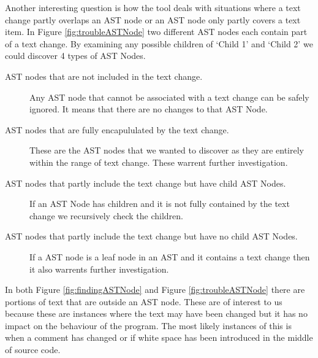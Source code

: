 Another interesting question is how the tool deals with situations where a text change partly overlaps an AST node or an AST node only partly covers a text item.  
In Figure \ref{fig:troubleASTNode} two different AST nodes each contain part of a text change. 
By examining any possible children of `Child 1' and `Child 2' we could discover 4 types of AST Nodes.
\begin{description}

  \item [AST nodes that are not included in the text change.]
    Any AST node that cannot be associated with a text change can be safely ignored. It means that there are no changes to that AST Node.
  \item [AST nodes that are fully encapululated by the text change.] 
    These are the AST nodes that we wanted to discover as they are entirely within the range of text change.  These warrent further investigation.
  \item [AST nodes that partly include the text change but have child AST Nodes.]
    If an AST Node has children and it is not fully contained by the text change we recursively check the children.
  \item [AST nodes that partly include the text change but have no child AST Nodes.]
    If a AST node is a leaf node in an AST and it contains a text change then it also warrents further investigation.       
\end{description}

In both Figure \ref{fig:findingASTNode} and Figure \ref{fig:troubleASTNode} there are portions of text that are outside an AST node.  These are of interest to us because these are instances where the text may have been changed but it has no impact on the behaviour of the program.  The most likely instances of this is when a comment has changed or if white space has been introduced in the middle of source code.

% 
% 
% 

